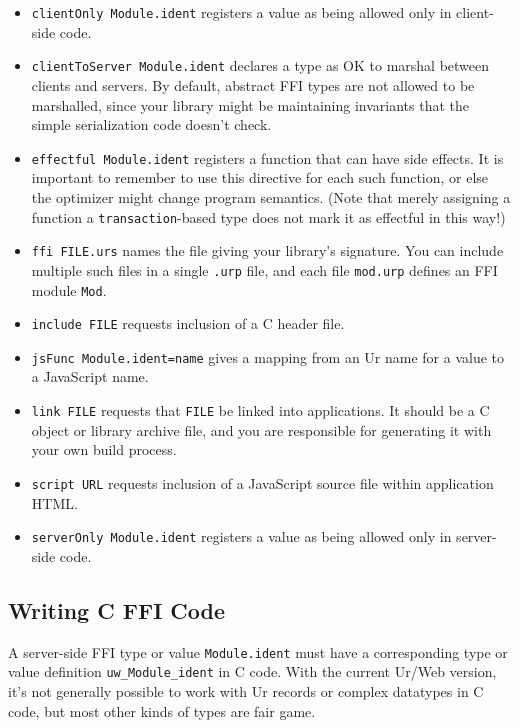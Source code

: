 \documentclass{article}
\begin{document}
\begin{itemize}
\item \texttt{clientOnly Module.ident} registers a value as being allowed only in client-side code.
\item \texttt{clientToServer Module.ident} declares a type as OK to marshal between clients and servers.  By default, abstract FFI types are not allowed to be marshalled, since your library might be maintaining invariants that the simple serialization code doesn't check.
\item \texttt{effectful Module.ident} registers a function that can have side effects.  It is important to remember to use this directive for each such function, or else the optimizer might change program semantics.  (Note that merely assigning a function a \texttt{transaction}-based type does not mark it as effectful in this way!)
\item \texttt{ffi FILE.urs} names the file giving your library's signature.  You can include multiple such files in a single \texttt{.urp} file, and each file \texttt{mod.urp} defines an FFI module \texttt{Mod}.
\item \texttt{include FILE} requests inclusion of a C header file.
\item \texttt{jsFunc Module.ident=name} gives a mapping from an Ur name for a value to a JavaScript name.
\item \texttt{link FILE} requests that \texttt{FILE} be linked into applications.  It should be a C object or library archive file, and you are responsible for generating it with your own build process.
\item \texttt{script URL} requests inclusion of a JavaScript source file within application HTML.
\item \texttt{serverOnly Module.ident} registers a value as being allowed only in server-side code.
\end{itemize}

\subsection{Writing C FFI Code}

A server-side FFI type or value \texttt{Module.ident} must have a corresponding type or value definition \texttt{uw\_Module\_ident} in C code.  With the current Ur/Web version, it's not generally possible to work with Ur records or complex datatypes in C code, but most other kinds of types are fair game.
\end{document}
